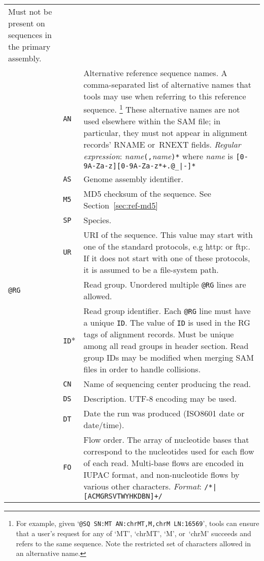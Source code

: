 \documentclass[10pt]{article}
\begin{document}
\begin{center}
\begin{longtable}{|l|l|p{13.5cm}|}
  Must not be present on sequences in the primary assembly.\\\cline{2-3}
  & {\tt AN} & Alternative reference sequence names.
A comma-separated list of alternative names that tools may use when referring
to this reference sequence.%
\footnote{For example, given `{\tt @SQ SN:MT AN:chrMT,M,chrM LN:16569}',
tools can ensure that a user's request for any of `MT', `chrMT', `M',
or~`chrM' succeeds and refers to the same sequence.
Note the restricted set of characters allowed in an alternative name.}
These alternative names are not used elsewhere within the SAM file;
in particular, they must not appear in alignment records' {\sf RNAME}
or~{\sf RNEXT} fields.
\emph{Regular expression}: \emph{name}{\tt (,}\emph{name}{\tt )*}
where \emph{name} is {\tt [0-9A-Za-z][0-9A-Za-z*+.@\_|-]*}\\\cline{2-3}
  & {\tt AS} & Genome assembly identifier. \\\cline{2-3}
  & {\tt M5} & MD5 checksum of the sequence.  See Section~\ref{sec:ref-md5}\\\cline{2-3}
  & {\tt SP} & Species.\\\cline{2-3}
  & {\tt UR} & URI of the sequence.  This value may start with one of the standard
  protocols, e.g http: or ftp:.  If it does not start with one of these protocols, it is assumed to be a file-system path.\\\cline{1-3}
  \multicolumn{2}{|l}{\tt @RG} & Read group. Unordered multiple {\tt @RG} lines are allowed.\\\cline{2-3}
  & {\tt ID}* & Read group identifier. Each {\tt @RG} line must have a unique {\tt ID}. The value of {\tt ID}
  is used in the RG tags of alignment records. Must be unique among all read groups in header section.  Read group IDs may be modified when merging SAM files in order to handle collisions.\\\cline{2-3}
  & {\tt CN} & Name of sequencing center producing the read.\\\cline{2-3}
  & {\tt DS} & Description.  UTF-8 encoding may be used.\\\cline{2-3}
  & {\tt DT} & Date the run was produced (ISO8601 date or date/time).\\\cline{2-3}
  & {\tt FO} & Flow order. The array of nucleotide bases that correspond to the nucleotides used for each flow of each read.
  	Multi-base flows are encoded in IUPAC format, and non-nucleotide flows by various other characters. \emph{Format}: {\tt /\char92*|[ACMGRSVTWYHKDBN]+/}\\\cline{2-3}

\end{longtable}
\end{center}
\end{document}
